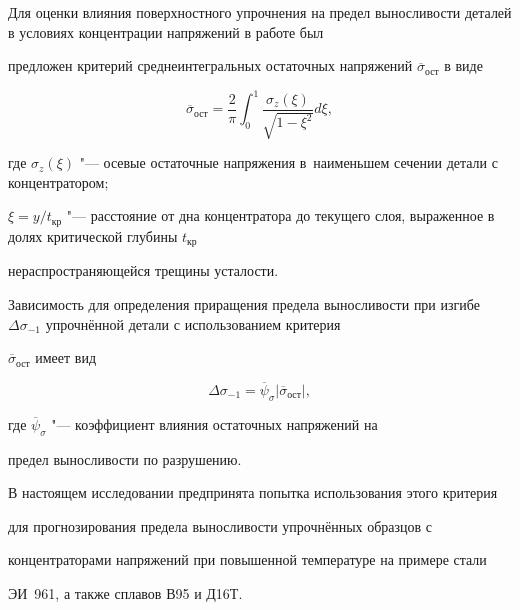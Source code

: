 \date{03/II/2010}






\maketitle \small



Для оценки влияния поверхностного упрочнения на предел выносливости деталей в условиях концентрации напряжений в работе \cite{kirpichev10:pavlov} был

предложен критерий среднеинтегральных остаточных напряжений $\overline \sigma_\text{ост}$ в виде

$$

\overline \sigma_\text{ост} =\frac{2}{\pi}\int_0^1 \frac{\sigma_z (\xi)}{\sqrt {1-\xi^2}}d\xi,

$$

где $\sigma_z (\xi)$ "--- осевые остаточные напряжения в~наименьшем сечении детали с концентратором; 

$\xi = {y}/{t_\text{кр}}$ "--- расстояние от дна концентратора до текущего слоя, выраженное в долях  критической глубины $t_\text{кр}$ 

нераспространяющейся трещины усталости.



Зависимость для определения приращения предела выносливости при изгибе $\Delta \sigma_{-1}$ упрочнённой детали с использованием критерия

$\overline \sigma_\text{ост}$ имеет вид

$$

\Delta \sigma_{-1} = \overline \psi_\sigma \left| \overline \sigma_\text{ост} \right|,

$$

где $\overline \psi_\sigma$ "--- коэффициент влияния остаточных напряжений на

предел выносливости по разрушению.



В настоящем исследовании предпринята попытка использования этого критерия

для прогнозирования предела выносливости упрочнённых образцов с

концентраторами напряжений при повышенной температуре на примере стали

ЭИ~961, а также сплавов В95 и Д16Т.



